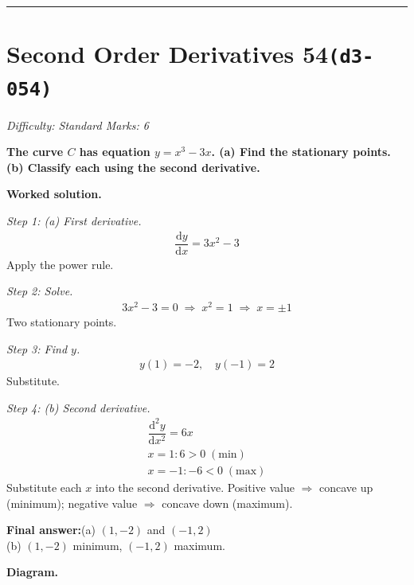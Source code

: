 \documentclass[11pt]{article}
\newcommand{\question}[1]{\par\medskip\noindent\textbf{#1}\par}
\begin{document}
\medskip\hrule

\section*{Second Order Derivatives 54\quad\small\texttt{(d3-054)}}
\textit{Difficulty: Standard \quad\textbar\quad Marks: 6}

\question{The curve \( C \) has equation \( y = x^3 - 3x \). (a) Find the stationary points. (b) Classify each using the second derivative.}

\textbf{Worked solution.}

\textit{Step 1: (a) First derivative.}
\[\begin{gathered}
\dfrac{\mathrm{d}y}{\mathrm{d}x} = 3x^2 - 3
\end{gathered}\]
Apply the power rule.

\textit{Step 2: Solve.}
\[\begin{gathered}
3x^2 - 3 = 0 \;\Rightarrow\; x^2 = 1 \;\Rightarrow\; x = \pm 1
\end{gathered}\]
Two stationary points.

\textit{Step 3: Find \( y \).}
\[\begin{gathered}
y(1) = -2, \quad y(-1) = 2
\end{gathered}\]
Substitute.

\textit{Step 4: (b) Second derivative.}
\[\begin{gathered}
\dfrac{\mathrm{d}^2y}{\mathrm{d}x^2} = 6x \\ x = 1: 6 > 0 \; (\text{min}) \\ x = -1: -6 < 0 \; (\text{max})
\end{gathered}\]
Substitute each \(x\) into the second derivative. Positive value \(\Rightarrow\) concave up (minimum); negative value \(\Rightarrow\) concave down (maximum).

\begin{answerbox}
\textbf{Final answer:}\quad (a) \(\displaystyle  (1, -2) \) and \(\displaystyle  (-1, 2) \) \\[3pt]  (b) \(\displaystyle  (1, -2) \) minimum, \(\displaystyle  (-1, 2) \) maximum.
\end{answerbox}
\textbf{Diagram.}
\end{document}
